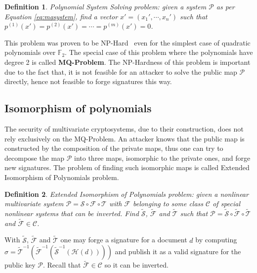 \documentclass{ufsctex/ufsctex}
\newtheorem{definition}{Definition}
\begin{document}
\begin{definition}
Polynomial System Solving problem: given a system $\mathcal{P}$ as per Equation
\ref{eq:mqsystem}, find a vector $x' = (x_1',\cdots,x_n')$ such that
$p^{(1)}(x') = p^{(2)}(x') = \cdots = p^{(m)}(x') = 0$.
\end{definition}

This problem was proven to be NP-Hard~\cite[Appendix A7.2]{garey1979npc} even
for the simplest case of quadratic polynomials over $\mathbb{F}_2$. The special
case of this problem where the polynomials have degree 2 is called
\textbf{MQ-Problem}. The NP-Hardness of this problem is important due to the
fact that, it is not feasible for an attacker to solve the public map
$\mathcal{P}$ directly, hence not feasible to forge signatures this way.

\subsection{Isomorphism of polynomials}

The security of multivariate cryptosystems, due to their construction, does not
rely exclusively on the MQ-Problem. An attacker knows that the public map is
constructed by the composition of the private maps, thus one can try to
decompose the map $\mathcal{P}$ into three maps, isomorphic to the private
ones, and forge new signatures. The problem of finding such isomorphic maps is
called Extended Isomorphism of Polynomials problem.

\begin{definition}
Extended Isomorphism of Polynomials problem: given a nonlinear multivariate
system $\mathcal{P} = \mathcal{S} \circ \mathcal{F} \circ \mathcal{T}$ with
$\mathcal{F}$ belonging to some class $\mathcal{C}$ of special nonlinear
systems that can be inverted. Find $\tilde{\mathcal{S}}$, $\tilde{\mathcal{F}}$
and $\tilde{\mathcal{T}}$ such that $\mathcal{P} = \tilde{\mathcal{S}} \circ
\tilde{\mathcal{F}} \circ \tilde{\mathcal{T}}$ and $\tilde{\mathcal{F}} \in
\mathcal{C}$.
\end{definition}

With $\tilde{\mathcal{S}}$, $\tilde{\mathcal{F}}$ and $\tilde{\mathcal{T}}$ one
may forge a signature for a document $d$ by computing $\sigma =
\tilde{\mathcal{T}}^{-1}(\tilde{\mathcal{F}}^{-1}(\tilde{\mathcal{S}}^{-1}(
\mathcal{H}(d))))$ and publish it as a valid signature for the public key
$\mathcal{P}$. Recall that $\tilde{\mathcal{F}} \in \mathcal{C}$ so it can be
inverted.
\end{document}
